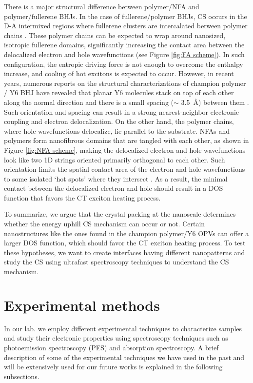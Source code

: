 \documentclass[12pt]{article}
\begin{document}
There is a major structural difference between polymer/NFA and polymer/fullerene BHJs. In the case of fullerene/polymer BHJs, CS occurs in the D-A intermixed regions where fullerene clusters are intercalated between polymer chains \cite{causa2016fate}. These polymer chains can be expected to wrap around nanosized, isotropic fullerene domains, significantly increasing the contact area between the delocalized electron and hole wavefunctions (see Figure \ref{fig:FA scheme}). In such configuration, the entropic driving force is not enough to overcome the enthalpy increase, and cooling of hot excitons is expected to occur. However, in recent years, numerous reports on the structural characterizations of champion polymer / Y6 BHJ have revealed that planar Y6 molecules stack on top of each other along the normal direction and there is a small spacing ($\sim$ \SI{3.5}{\angstrom}) between them \cite{liu202018,zhang2020delocalization,zhu2020crystallography}. Such orientation and spacing can result in a strong nearest-neighbor electronic coupling and electron delocalization. On the other hand, the polymer chains, where hole wavefunctions delocalize, lie parallel to the substrate. NFAs and polymers form nanofibrous domains that are tangled with each other, as shown in Figure \ref{fig:NFA scheme}, making the delocalized electron and hole wavefunctions look like two 1D strings oriented primarily orthogonal to each other. Such orientation limits the spatial contact area of the electron and hole wavefunctions to some isolated \lq{hot spots}' where they intersect \cite{zhang2020delocalization}. As a result, the minimal contact between the delocalized electron and hole should result in a DOS function that favors the CT exciton heating process.
\vspace{7pt}

To summarize, we argue that the crystal packing at the nanoscale determines whether the energy uphill CS mechanism can occur or not. Certain nanostructures like the ones found in the champion polymer/Y6 OPVs can offer a larger DOS function, which should favor the CT exciton heating process. To test these hypotheses, we want to create interfaces having different nanopatterns and study the CS using ultrafast spectroscopy techniques to understand the CS mechanism.

\section{Experimental methods}
In our lab. we employ different experimental techniques to characterize samples and study their electronic properties using spectroscopy techniques such as photoemission spectroscopy (PES) and absorption spectroscopy. A brief description of some of the experimental techniques we have used in the past and will be extensively used for our future works is explained in the following subsections. 
\end{document}
